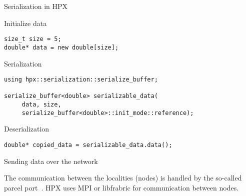 \documentclass[\classoption]{beamer}
\begin{document}
\begin{frame}[fragile]{Serialization in HPX~\cite{ac:2017}}

\begin{block}{Initialize data}
\begin{lstlisting}
size_t size = 5;
double* data = new double[size];
\end{lstlisting}
\end{block}

\begin{block}{Serialization}
\begin{lstlisting}
using hpx::serialization::serialize_buffer;

serialize_buffer<double> serializable_data(
     data, size,
     serialize_buffer<double>::init_mode::reference);
\end{lstlisting}
\end{block}

\begin{block}{Deserialization}
\begin{lstlisting}
double* copied_data = serializable_data.data();
\end{lstlisting}
\end{block}

\end{frame}

\begin{frame}{Sending data over the network}

\begin{center}
\end{center}
The communication between the localities (nodes) is handled by the so-called parcel port~\cite{kaiser2009parallex}. HPX uses MPI or libfrabric for communication between nodes. 
\end{frame}
\end{document}

